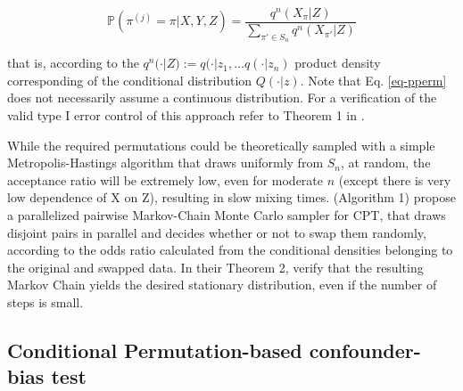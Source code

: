 \documentclass{article}
\theoremstyle{definition}
\begin{document}
\begin{equation}
    \mathbb{P}(\pi^{(j)} = \pi | X,Y,Z) = \frac{q^n(X_\pi | Z)}{\sum_{\pi' \in S_n} q^n(X_{\pi'} | Z)}
    \label{eq-pperm}
\end{equation}

that is, according to the $q^n(\cdot|Z) := q(\cdot | z_1, \dots q(\cdot|z_n)$ product density corresponding of the conditional distribution $Q(\cdot|z)$. Note that Eq. \ref{eq-pperm} does not necessarily assume a continuous distribution.
For a verification of the valid type I error control of this approach refer to Theorem 1 in \citep{berrett2020conditional}.

While the required permutations could be theoretically sampled with a simple Metropolis-Hastings algorithm that draws uniformly from $S_n$, at random, the acceptance ratio will be extremely low, even for moderate $n$ (except there is very low dependence of X on Z), resulting in slow mixing times. \cite{berrett2020conditional} (Algorithm 1) propose a parallelized pairwise Markov-Chain Monte Carlo sampler for CPT, that draws disjoint pairs in parallel and decides whether or not to swap them randomly, according to the odds ratio calculated from the conditional densities belonging to the original and swapped data. In their Theorem 2, \cite{berrett2020conditional} verify that the resulting Markov Chain yields the desired stationary distribution, even if the number of steps is small.

\subsection{Conditional Permutation-based confounder-bias test}
\end{document}
